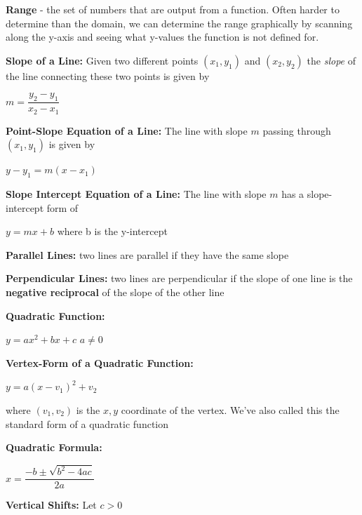 \documentclass[12pt]{article}
\begin{document}
\textbf{Range} - the set of numbers that are output from a function. Often harder to determine than the domain, we can determine the range graphically by scanning along the y-axis and seeing what y-values the function is not defined for.
\newpage


\textbf{Slope of a Line: } Given two different points $(x_{1},y_{1})$ and $(x_{2}, y_{2})$ the \textit{slope} of the line connecting these two points is given by
\newline

\centerline{$m = \dfrac{y_{2} - y_{1}}{x_{2}-x_{1}}$}
\vspace{.5cm}

\textbf{Point-Slope Equation of a Line:} The line with slope $m$ passing through $(x_{1}, y_{1})$ is given by
\newline

\centerline{$y - y_{1} = m(x-x_{1})$}
\vspace{.5cm}

\textbf{Slope Intercept Equation of a Line:} The line with slope $m$ has a slope-intercept form of 
\newline

\centerline{$y = mx+b$ \hspace{1cm} where b is the y-intercept}

\textbf{Parallel Lines:} two lines are parallel if they have the same slope

\textbf{Perpendicular Lines:} two lines are perpendicular if the slope of one line is the \textbf{negative reciprocal} of the slope of the other line

\textbf{Quadratic Function:} 
\newline

\centerline{$y = ax^2+bx+c$ \hspace{1cm} $a \neq 0$}
\vspace{.5cm}

\textbf{Vertex-Form of a Quadratic Function:} 
\newline

\centerline{$y = a(x-v_{1})^2+v_{2}$}

where $(v_{1},v_{2})$ is the $x,y$ coordinate of the vertex. We've also called this the standard form of a quadratic function
\newpage

\textbf{Quadratic Formula:} 
\newline

\centerline{$x = \dfrac{-b \pm \sqrt{b^2-4ac}}{2a}$}

\textbf{Vertical Shifts:} Let $c>0$
\end{document}
